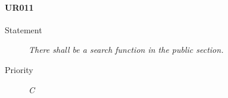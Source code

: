 \paragraph{UR011}
  \begin{description}
  \item [Statement] 
    \textit{ There shall be a search function in the public section.}
  \item [Priority] \textit{C}
\end{description}